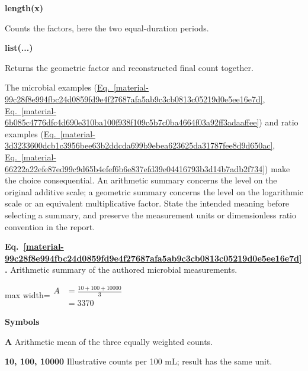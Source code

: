 \documentclass[11pt,a4paper]{article}
\begin{document}
\par\noindent\textbf{length(x)}

Counts the factors, here the two equal-duration periods.

\par\noindent\textbf{list(...)}

Returns the geometric factor and reconstructed final count together.

\medskip

The microbial examples (\hyperref[material-99c28f8e994fbc24d0859fd9e4f27687afa5ab9c3cb0813c05219d0e5ee16e7d]{Eq.~\ref*{material-99c28f8e994fbc24d0859fd9e4f27687afa5ab9c3cb0813c05219d0e5ee16e7d}}, \hyperref[material-6b085c4776dfc4d690e310ba100f938f109c5b7c0ba4664f03a92ff3adaaffee]{Eq.~\ref*{material-6b085c4776dfc4d690e310ba100f938f109c5b7c0ba4664f03a92ff3adaaffee}}) and ratio examples (\hyperref[material-3d3233600dcb1c3956bee63b2ddcda699b9ebea623625da31787fee8d9d650ac]{Eq.~\ref*{material-3d3233600dcb1c3956bee63b2ddcda699b9ebea623625da31787fee8d9d650ac}}, \hyperref[material-66222a22efe87ed99c9d65b4efef6b6e837efd39e04416793b3d14b7adb2f734]{Eq.~\ref*{material-66222a22efe87ed99c9d65b4efef6b6e837efd39e04416793b3d14b7adb2f734}}) make the choice consequential. An arithmetic summary concerns the level on the original additive scale; a geometric summary concerns the level on the logarithmic scale or an equivalent multiplicative factor. State the intended meaning before selecting a summary, and preserve the measurement units or dimensionless ratio convention in the report.


\par\medskip
\noindent\begin{minipage}{\linewidth}
\label{material-99c28f8e994fbc24d0859fd9e4f27687afa5ab9c3cb0813c05219d0e5ee16e7d}
\noindent\textbf{Eq.~\ref*{material-99c28f8e994fbc24d0859fd9e4f27687afa5ab9c3cb0813c05219d0e5ee16e7d}.} Arithmetic summary of the authored microbial measurements.\par\nopagebreak
\begin{center}\begin{adjustbox}{max width=\linewidth}$\displaystyle \begin{aligned}A&=\frac{10+100+10000}{3}\\&=3370\end{aligned}$\end{adjustbox}\end{center}

\par\noindent\textbf{Symbols}

\par\noindent\textbf{A} Arithmetic mean of the three equally weighted counts.

\par\noindent\textbf{10, 100, 10000} Illustrative counts per 100 mL; result has the same unit.

\end{minipage}\par
\medskip
\end{document}
